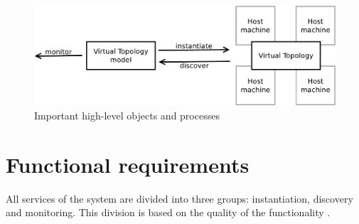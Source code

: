 \documentclass[11pt,openany]{book}
\begin{document}
      \begin{figure}[H]
        \centering
        \includegraphics[width=.7\textwidth]{img/req/overview.pdf}

        \caption{Important high-level objects and processes}
        \label{fig:req:overview}
      \end{figure}



    \section{Functional requirements}
    \label{sec:req:func}

      All services of the system are divided into three groups: instantiation, discovery and monitoring. This
      division is based on the quality of the functionality . 

\end{document}
